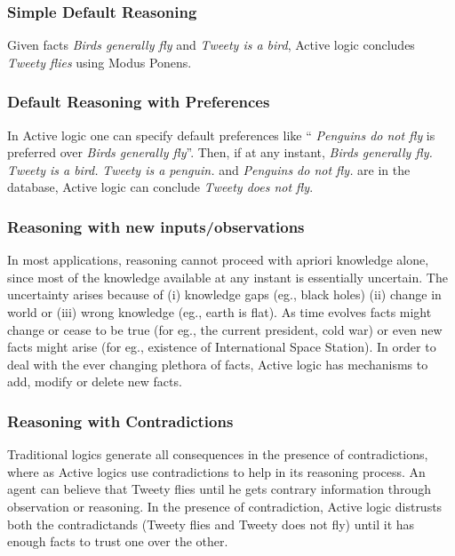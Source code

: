 \documentclass{article}
\begin{document}
\subsubsection{Simple Default Reasoning}
	 Given facts {\em Birds generally fly} and {\em Tweety is a bird},
	Active logic concludes {\em Tweety flies} using Modus Ponens.
	
\subsubsection{Default Reasoning with Preferences}

	In Active logic one can specify default preferences like  ``{\em
	Penguins do not fly} is preferred over {\em Birds generally
	fly}''. Then, if at any instant, {\em Birds generally fly.}
	{\em Tweety is a bird.} {\em Tweety is a
	penguin.} and {\em Penguins do not fly.} are in the database,
	Active logic can conclude {\em Tweety does not fly}.

\subsubsection{Reasoning with new inputs/observations}
In most applications, reasoning cannot proceed with apriori knowledge
alone, since most of the knowledge available at any instant is
essentially uncertain. The uncertainty arises because of (i) knowledge
gaps (eg., black holes)  (ii) change in world or (iii) wrong
knowledge (eg., earth is flat).  As time evolves
facts might change or cease to be true (for eg., the current
president, cold war) or even new facts might arise (for eg., existence of
International Space Station).  In order to deal with the ever changing
plethora of facts, Active logic has mechanisms to add, modify or
delete new facts.

\subsubsection{Reasoning with Contradictions}
Traditional logics generate all consequences in the presence of contradictions, where
as Active logics use contradictions to help in its reasoning
process. An agent can believe that Tweety flies until he gets contrary
information through observation or reasoning. In the presence of
contradiction, Active logic distrusts both the contradictands (Tweety
flies and Tweety does not fly) until it has enough facts to
trust one over the other.
\end{document}
